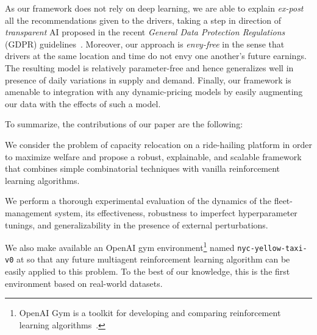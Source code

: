 As our framework does not rely on deep learning, we are able to explain 
    \emph{ex-post} all the recommendations given to
    the drivers, taking a step in direction of \emph{transparent} AI
   proposed
    in the recent \emph{General Data Protection Regulations} (GDPR)
    guidelines~\cite{Vincent2019-eg}.
Moreover, our approach is \emph{envy-free} in the sense that drivers at the same 
    location and time do not envy one another's future earnings.
The resulting model is relatively parameter-free and hence generalizes well in
    presence of daily variations in supply and demand.
Finally, our framework is amenable to 
    integration with any dynamic-pricing models by easily augmenting our data
    with the effects of such a model.

 To summarize, the contributions of our paper are the following:
\squishlist
\item We consider the problem of capacity relocation on a 
        ride-hailing platform in order to maximize welfare and propose a robust, 
        explainable, and scalable framework that combines simple combinatorial techniques
        with vanilla reinforcement learning algorithms.
\item We perform a thorough experimental evaluation of the dynamics of
        the fleet-management system, its effectiveness, robustness to imperfect
        hyperparameter tunings, and 
        generalizability in the presence of external perturbations.
\item We also make available an OpenAI gym environment\footnote{OpenAI
        Gym is a toolkit for developing and comparing reinforcement learning
        algorithms~\cite{open-ai-gym}.}
        named \texttt{nyc-yellow-taxi-v0} at \cite{github-page} so that any 
        future multiagent reinforcement learning 
        algorithm can be easily applied to this problem.
    To the best of our knowledge, this is the first environment based on 
        real-world datasets.
\squishend
